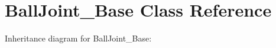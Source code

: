 \hypertarget{class_ball_joint___base}{}\section{Ball\+Joint\+\_\+\+Base Class Reference}
\label{class_ball_joint___base}


Inheritance diagram for Ball\+Joint\+\_\+\+Base\+:
